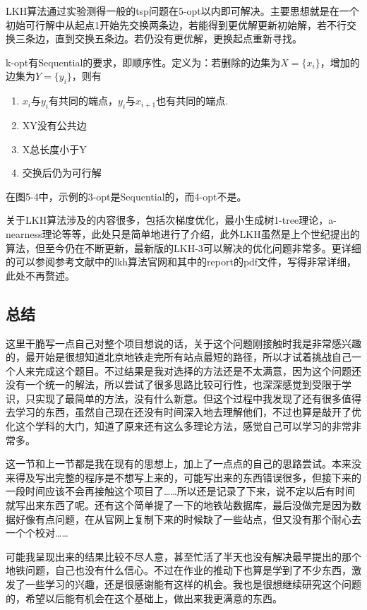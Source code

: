 \documentclass[12pt]{article}
\begin{document}
LKH算法通过实验测得一般的tsp问题在5-opt以内即可解决。主要思想就是在一个初始可行解中从起点1开始先交换两条边，若能得到更优解更新初始解，若不行交换三条边，直到交换五条边。若仍没有更优解，更换起点重新寻找。

k-opt有Sequential的要求，即顺序性。定义为：若删除的边集为$X=\{x_{i}\}$，增加的边集为$Y=\{y_{i} \}$，则有
\begin{enumerate}
	\item $x_{i}$与$y_{i}$有共同的端点，$y_{i}$与$x_{i+1}$也有共同的端点.
	\item XY没有公共边
	\item X总长度小于Y
	\item 交换后仍为可行解
\end{enumerate}
在图5-4中，示例的3-opt是Sequential的，而4-opt不是。

关于LKH算法涉及的内容很多，包括次梯度优化，最小生成树1-tree理论，a-nearness理论等等，此处只是简单地进行了介绍，此外LKH虽然是上个世纪提出的算法，但至今仍在不断更新，最新版的LKH-3可以解决的优化问题非常多。更详细的可以参阅参考文献中的lkh算法官网和其中的report的pdf文件，写得非常详细，此处不再赘述。
\subsection{总结}
这里干脆写一点自己对整个项目想说的话，关于这个问题刚接触时我是非常感兴趣的，最开始是很想知道北京地铁走完所有站点最短的路径，所以才试着挑战自己一个人来完成这个题目。不过结果是我对选择的方法还是不太满意，因为这个问题还没有一个统一的解法，所以尝试了很多思路比较可行性，也深深感觉到受限于学识，只实现了最简单的方法，没有什么新意。但这个过程中我发现了还有很多值得去学习的东西，虽然自己现在还没有时间深入地去理解他们，不过也算是敲开了优化这个学科的大门，知道了原来还有这么多理论方法，感觉自己可以学习的非常非常多。

这一节和上一节都是我在现有的思想上，加上了一点点的自己的思路尝试。本来没来得及写出完整的程序是不想写上来的，可能写出来的东西错误很多，但接下来的一段时间应该不会再接触这个项目了……所以还是记录了下来，说不定以后有时间就写出来东西了呢。还有这个简单提了一下的地铁站数据库，最后没做完是因为数据好像有点问题，在从官网上复制下来的时候缺了一些站点，但又没有那个耐心去一个个校对……

可能我呈现出来的结果比较不尽人意，甚至忙活了半天也没有解决最早提出的那个地铁问题，自己也没有什么信心。不过在作业的推动下也算是学到了不少东西，激发了一些学习的兴趣，还是很感谢能有这样的机会。我也是很想继续研究这个问题的，希望以后能有机会在这个基础上，做出来我更满意的东西。
\newpage
{}
\end{document}
